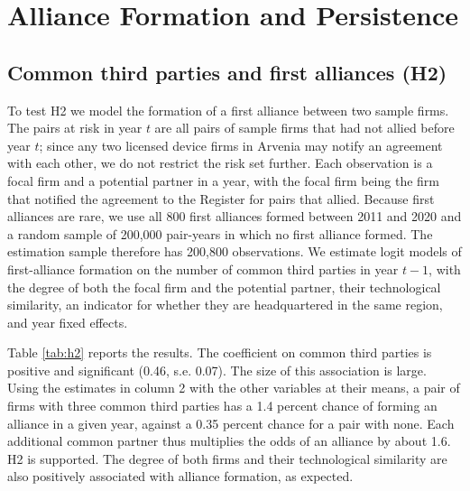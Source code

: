 \documentclass[12pt]{article}
\begin{document}
\section{Alliance Formation and Persistence}

\subsection{Common third parties and first alliances (H2)}

To test H2 we model the formation of a first alliance between two sample firms. The pairs at risk in year $t$ are all pairs of sample firms that had not allied before year $t$; since any two licensed device firms in Arvenia may notify an agreement with each other, we do not restrict the risk set further. Each observation is a focal firm and a potential partner in a year, with the focal firm being the firm that notified the agreement to the Register for pairs that allied. Because first alliances are rare, we use all 800 first alliances formed between 2011 and 2020 and a random sample of 200,000 pair-years in which no first alliance formed. The estimation sample therefore has 200,800 observations. We estimate logit models of first-alliance formation on the number of common third parties in year $t-1$, with the degree of both the focal firm and the potential partner, their technological similarity, an indicator for whether they are headquartered in the same region, and year fixed effects.

Table \ref{tab:h2} reports the results. The coefficient on common third parties is positive and significant (0.46, s.e. 0.07). The size of this association is large. Using the estimates in column 2 with the other variables at their means, a pair of firms with three common third parties has a 1.4 percent chance of forming an alliance in a given year, against a 0.35 percent chance for a pair with none. Each additional common partner thus multiplies the odds of an alliance by about 1.6. H2 is supported. The degree of both firms and their technological similarity are also positively associated with alliance formation, as expected.
\end{document}
